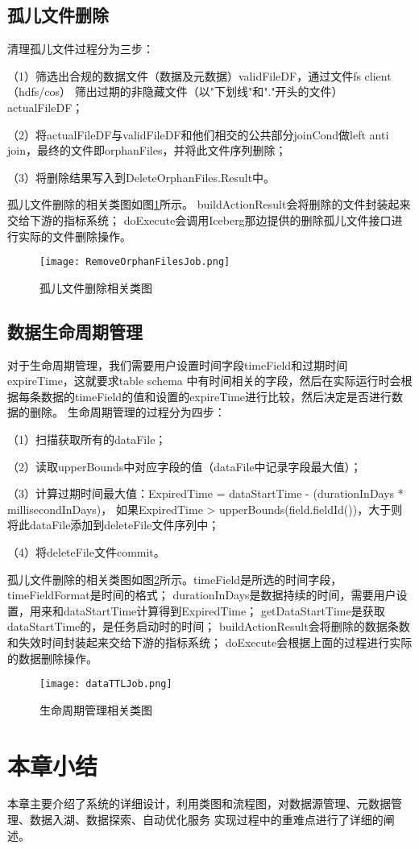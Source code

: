 \subsection{孤儿文件删除}

清理孤⼉⽂件过程分为三步：

（1）筛选出合规的数据⽂件（数据及元数据）validFileDF，通过⽂件fs client（hdfs/cos）
筛出过期的⾮隐藏⽂件（以"下划线"和"."开头的⽂件）actualFileDF；

（2）将actualFileDF与validFileDF和他们相交的公共部分joinCond做left anti join，最终的⽂件即orphanFiles，并将此⽂件序列删除；

（3）将删除结果写⼊到DeleteOrphanFiles.Result中。

孤儿文件删除的相关类图如图\ref{fig:孤儿文件删除相关类图}所示。
buildActionResult会将删除的文件封装起来交给下游的指标系统；
doExecute会调用Iceberg那边提供的删除孤儿文件接口进行实际的文件删除操作。

\begin{figure}[H]
  \centering
  \texttt{[image: RemoveOrphanFilesJob.png]}
  \caption{孤儿文件删除相关类图}
  \label{fig:孤儿文件删除相关类图}
\end{figure}

\subsection{数据生命周期管理}

对于生命周期管理，我们需要用户设置时间字段timeField和过期时间expireTime，这就要求table schema
中有时间相关的字段，然后在实际运行时会根据每条数据的timeField的值和设置的expireTime进行比较，然后决定是否进行数据的删除。
生命周期管理的过程分为四步：

（1）扫描获取所有的dataFile；

（2）读取upperBounds中对应字段的值（dataFile中记录字段最大值）；

（3）计算过期时间最大值：ExpiredTime = dataStartTime - (durationInDays * millisecondInDays)，
如果ExpiredTime > upperBounds(field.fieldId())，大于则将此dataFile添加到deleteFile文件序列中；

（4）将deleteFile文件commit。

孤儿文件删除的相关类图如图\ref{fig:dataTTLJob}所示。timeField是所选的时间字段，timeFieldFormat是时间的格式；
durationInDays是数据持续的时间，需要用户设置，用来和dataStartTime计算得到ExpiredTime；
getDataStartTime是获取dataStartTime的，是任务启动时的时间；
buildActionResult会将删除的数据条数和失效时间封装起来交给下游的指标系统；
doExecute会根据上面的过程进行实际的数据删除操作。

\begin{figure}[H]
  \centering
  \texttt{[image: dataTTLJob.png]}
  \caption{生命周期管理相关类图}
  \label{fig:dataTTLJob}
\end{figure}

\section{本章小结}

本章主要介绍了系统的详细设计，利用类图和流程图，对数据源管理、元数据管理、数据入湖、数据探索、自动优化服务
实现过程中的重难点进行了详细的阐述。
